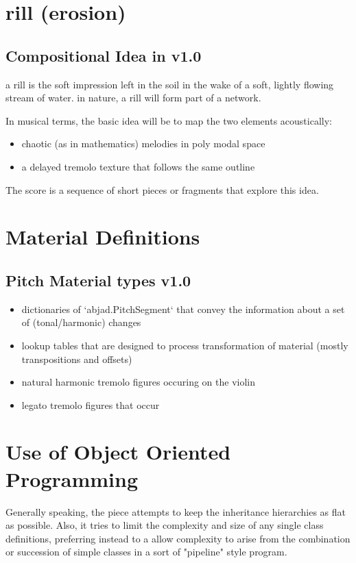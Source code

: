 \documentclass[11pt]{article}
\author{adam}
\date{\today}
\title{}
\begin{document}
\tableofcontents

\section{rill (erosion)}
\label{sec:orgcbe8723}

\subsection{Compositional Idea in v1.0}
\label{sec:org0452364}
a rill is the soft impression left in the soil in the wake of a soft, lightly 
flowing stream of water. in nature, a rill will form part of a network. 

In musical terms, the basic idea will be to map the two elements acoustically: 

\begin{itemize}
\item chaotic (as in mathematics) melodies in poly modal space
\item a delayed tremolo texture that follows the same outline
\end{itemize}

The score is a sequence of short pieces or fragments that explore this
idea.  


\section{Material Definitions}
\label{sec:org0240183}
\subsection{Pitch Material types v1.0}
\label{sec:orgf0c49f8}
\begin{itemize}
\item dictionaries of `abjad.PitchSegment` that convey the information about a set of (tonal/harmonic)
changes
\item lookup tables that are designed to process transformation of
material (mostly transpositions and offsets)
\item natural harmonic tremolo figures occuring on the violin
\item legato tremolo figures that occur
\end{itemize}


\section{Use of Object Oriented Programming}
\label{sec:orgd497e0c}
Generally speaking, the piece attempts to keep the inheritance
hierarchies as flat as possible. Also, it tries to limit the
complexity and size of any single class definitions, preferring
instead to a allow complexity to arise from the combination or
succession of simple classes in a sort of "pipeline" style program. 
\end{document}
